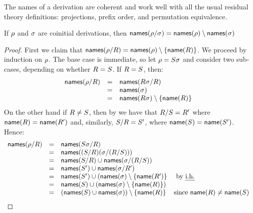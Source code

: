 The names of a derivation are coherent and work well
with all the usual residual theory definitions: projections, prefix order, and permutation
equivalence.

\begin{lemma}
If $\rho$ and $\sigma$ are coinitial derivations, then
$\mathsf{names}(\rho/\sigma) = \mathsf{names}(\rho) \setminus \mathsf{names}(\sigma)$
\end{lemma}
\begin{proof}
First we claim that $\mathsf{names}(\rho/R) = \mathsf{names}(\rho) \setminus \{\mathsf{name}(R)\}$.
We proceed by induction on $\rho$.
The base case is immediate, so let $\rho = S\sigma$
and consider two sub-cases, depending on whether $R = S$.
If $R = S$,
then:
\[
  \begin{array}{rcl}
  \mathsf{names}(\rho/R) & = & \mathsf{names}(R\sigma/R) \\
                         & = & \mathsf{names}(\sigma) \\
                         & = & \mathsf{names}(R\sigma) \setminus \{\mathsf{name}(R)\} \\
  \end{array}
\]
On the other hand if $R \neq S$,
then by 
we have that $R/S = R'$
where $\mathsf{name}(R) = \mathsf{name}(R')$
and, similarly,
$S/R = S'$,
where $\mathsf{name}(S) = \mathsf{name}(S')$. Hence:
\[
  \begin{array}{rcll}
  \mathsf{names}(\rho/R) & = & \mathsf{names}(S\sigma/R) \\
                         & = & \mathsf{names}((S/R)(\sigma/(R/S))) \\
                         & = & \mathsf{names}(S/R) \cup \mathsf{names}(\sigma/(R/S)) \\
                         & = & \mathsf{names}(S') \cup \mathsf{names}(\sigma/R') \\
                         & = & \mathsf{names}(S') \cup (\mathsf{names}(\sigma) \setminus \{\mathsf{name}(R')\} & \text{ by {\em i.h.}} \\
                         & = & \mathsf{names}(S) \cup (\mathsf{names}(\sigma) \setminus \{\mathsf{name}(R)\}) \\
                         & = & (\mathsf{names}(S) \cup \mathsf{names}(\sigma)) \setminus \{\mathsf{name}(R)\} & \text{since $\mathsf{name}(R) \neq \mathsf{name}(S)$} \\

\end{array}\]
\end{proof}
